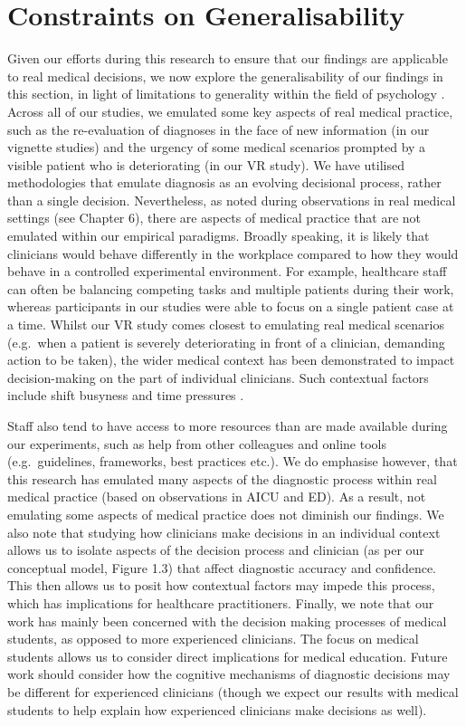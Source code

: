 \documentclass[a4paper, nobind]{templates/ociamthesis}
\begin{document}
\section{Constraints on Generalisability}\label{constraints-on-generalisability}

Given our efforts during this research to ensure that our findings are applicable to real medical decisions, we now explore the generalisability of our findings in this section, in light of limitations to generality within the field of psychology \autocite{yarkoni_generalizability_2022}. Across all of our studies, we emulated some key aspects of real medical practice, such as the re-evaluation of diagnoses in the face of new information (in our vignette studies) and the urgency of some medical scenarios prompted by a visible patient who is deteriorating (in our VR study). We have utilised methodologies that emulate diagnosis as an evolving decisional process, rather than a single decision. Nevertheless, as noted during observations in real medical settings (see Chapter 6), there are aspects of medical practice that are not emulated within our empirical paradigms. Broadly speaking, it is likely that clinicians would behave differently in the workplace compared to how they would behave in a controlled experimental environment. For example, healthcare staff can often be balancing competing tasks and multiple patients during their work, whereas participants in our studies were able to focus on a single patient case at a time. Whilst our VR study comes closest to emulating real medical scenarios (e.g.~when a patient is severely deteriorating in front of a clinician, demanding action to be taken), the wider medical context has been demonstrated to impact decision-making on the part of individual clinicians. Such contextual factors include shift busyness and time pressures \autocites[@][]{yang_effect_2012,soares_accuracy_2019,gupta_associations_2023}.

\hfill\break
Staff also tend to have access to more resources than are made available during our experiments, such as help from other colleagues and online tools (e.g.~guidelines, frameworks, best practices etc.). We do emphasise however, that this research has emulated many aspects of the diagnostic process within real medical practice (based on observations in AICU and ED). As a result, not emulating some aspects of medical practice does not diminish our findings. We also note that studying how clinicians make decisions in an individual context allows us to isolate aspects of the decision process and clinician (as per our conceptual model, Figure 1.3) that affect diagnostic accuracy and confidence. This then allows us to posit how contextual factors may impede this process, which has implications for healthcare practitioners. Finally, we note that our work has mainly been concerned with the decision making processes of medical students, as opposed to more experienced clinicians. The focus on medical students allows us to consider direct implications for medical education. Future work should consider how the cognitive mechanisms of diagnostic decisions may be different for experienced clinicians (though we expect our results with medical students to help explain how experienced clinicians make decisions as well).
\end{document}
